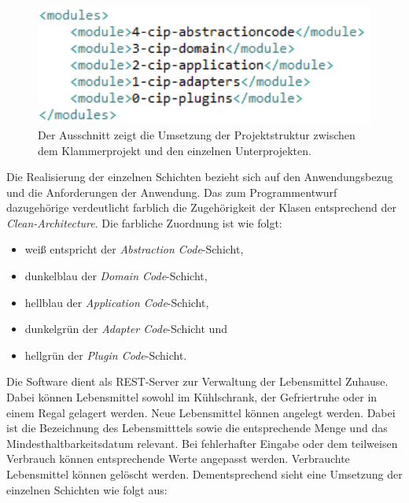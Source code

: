 \begin{figure}[H]
	\centering
	\includegraphics[width=1.0\textwidth]{Bilder/ausschnitt-pom.PNG}
	\caption[Ausschnitt aus der pom.xml zur Projektstruktur.]{Der Ausschnitt zeigt die Umsetzung der Projektstruktur zwischen dem Klammerprojekt und den einzelnen Unterprojekten.}
	\label{fig:umsetzung-pom}
\end{figure}

Die Realisierung der einzelnen Schichten bezieht sich auf den Anwendungsbezug und die Anforderungen der Anwendung.
Das zum Programmentwurf dazugehörige \href{https://github.com/lucasmerkel/dhbw-advancedswe-programmentwurf/blob/d5c89113d12c3b877ddc4d6a99225b277ddd468f/Documentation/Bilder/uml-diagramme/klassendiagramm.svg}{} verdeutlicht farblich die Zugehörigkeit der Klasen entsprechend der \textit{Clean-Architecture}.
Die farbliche Zuordnung ist wie folgt:
\begin{itemize}
    \item weiß entspricht der \textit{Abstraction Code}-Schicht,
    \item dunkelblau der \textit{Domain Code}-Schicht,
    \item hellblau der \textit{Application Code}-Schicht,
    \item dunkelgrün der \textit{Adapter Code}-Schicht und
    \item hellgrün der \textit{Plugin Code}-Schicht.
\end{itemize}


Die Software dient als \ac{REST}-Server zur Verwaltung der Lebensmittel Zuhause.
Dabei können Lebensmittel sowohl im Kühlschrank, der Gefriertruhe oder in einem Regal gelagert werden.
Neue Lebensmittel können angelegt werden.
Dabei ist die Bezeichnung des Lebensmitttels sowie die entsprechende Menge und das Mindesthaltbarkeitsdatum relevant.
Bei fehlerhafter Eingabe oder dem teilweisen Verbrauch können entsprechende Werte angepasst werden.
Verbrauchte Lebensmittel können gelöscht werden.
Dementsprechend sieht eine Umsetzung der einzelnen Schichten wie folgt aus:

